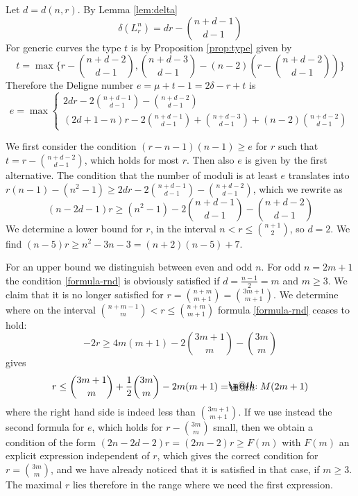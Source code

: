\documentclass{amsart}
\makeatletter
\newcommand*{\eqdef}{=\mathrel{\rlap{%
                     \raisebox{0.3ex}{$\m@th\cdot$}}%
                     \raisebox{-0.3ex}{$\m@th\cdot$}}}
\theoremstyle{definition}
\theoremstyle{remark}
\makeatother
\begin{document}
Let $d=d(n,r)$.
By Lemma \ref{lem:delta}
\[
\delta(L_r^n) = dr-\binom{n+d-1}{d-1}
\]
For generic curves the type $t$ is by Proposition \ref{prop:type} given by
\[\textstyle
t= \max \{ r-\binom{n+d-2}{d-1}, \binom{n+d-3}{d-1}-(n-2)\left( r-\binom{n+d-2}{d-1}\right)\}\]
%
 Therefore the Deligne number $e=\mu+t-1=2\delta-r+t$
 is
 \[\textstyle
e= \max \begin{cases}
 2dr-2\binom{n+d-1}{d-1}-\binom{n+d-2}{d-1}\\ 
 (2d+1-n)r-2\binom{n+d-1}{d-1}+\binom{n+d-3}{d-1}+(n-2)\binom{n+d-2}{d-1}
\end{cases}\]

 We first  consider the condition $(r-n-1)(n-1) \geq e$ for $r$ %
such  that $ t = r-\binom{n+d-2}{d-1}$, which holds for most $r$. Then also $e$ is given by the
first alternative. The condition that the number of moduli is at least $e$
translates into
$r(n-1)-(n^2-1)\geq  2dr-2\binom{n+d-1}{d-1}-\binom{n+d-2}{d-1}$, which we rewrite as
\begin{equation} \label{formula-rnd}
(n-2d-1)r\geq (n^2-1)-2\binom{n+d-1}{d-1}-\binom{n+d-2}{d-1}
\end{equation}
We determine a lower bound for $r$, in the interval $n<r\leq \binom {n+1}2$, so $d=2$.
We find $(n-5)r\geq n^2-3n-3=(n+2)(n-5)+7$. 

For an upper bound we distinguish between even and odd $n$. 
For odd  $n=2m+1$  the condition \eqref{formula-rnd} is obviously satisfied if $d=\frac{n-1}2=m$ and $m\geq 3$.
We claim that it is no longer satisfied for  $r=\binom{n+m}{m+1}=\binom{3m+1}{m+1}$.
We determine where on the interval $\binom{n+m-1}{m} <r \leq \binom{n+m}{m+1}$
formula  \eqref{formula-rnd} ceases to hold:
\[
-2r\geq 4m(m+1) -2\binom{3m+1}{m}-\binom{3m}{m}
\]
gives 
\begin{equation}\label{eq:odd}
r\leq \binom{3m+1}{m}+ \frac12\binom{3m}{m}-2m(m+1)\eqdef M(2m+1)
\end{equation}
where the right hand side is indeed less than $\binom{3m+1}{m+1}$.
If we use instead the second formula for $e$, which holds for $r-\binom{3m}{m}$ small,
then we obtain a condition of the form
$(2n-2d-2)r=(2m-2)r \geq F(m)$ with $F(m)$ an explicit expression independent of $r$, which
gives the correct condition for $r=\binom{3m}{m}$, and we have already noticed that it is satisfied
in that case, if $m\geq3$. The maximal   $r$  lies therefore in the range where we need the
first expression.
\end{document}
